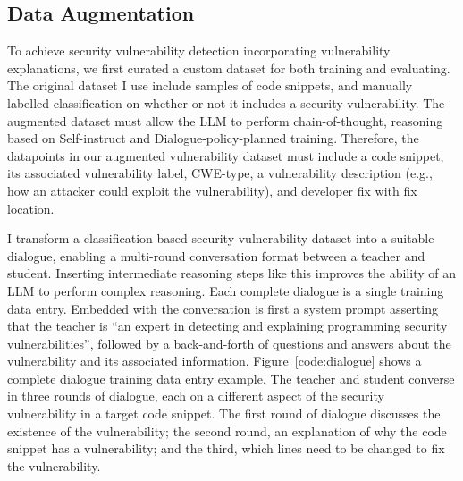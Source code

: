 \documentclass[12pt,openany,oneside,table]{cmuthesis}
\begin{document}
\subsection{Data Augmentation}
To achieve security vulnerability detection incorporating vulnerability explanations, we first curated a custom dataset for both training and evaluating. The original dataset I use include samples of code snippets, and manually labelled classification on whether or not it includes a security vulnerability. The augmented dataset must allow the LLM to perform chain-of-thought, reasoning based on Self-instruct and Dialogue-policy-planned training. Therefore, the datapoints in our augmented vulnerability dataset must include a code snippet, its associated vulnerability label, CWE-type, a vulnerability description (e.g., how an attacker could exploit the vulnerability), and developer fix with fix location. 

I transform a classification based security vulnerability dataset into a suitable dialogue, enabling a multi-round conversation format between a teacher and student. 
Inserting intermediate reasoning steps like this improves the ability of an LLM to perform complex reasoning. Each complete dialogue is a single training data entry. Embedded with the conversation is first a system prompt asserting that the teacher is ``an expert in detecting and explaining programming security vulnerabilities'', followed by a back-and-forth of questions and answers about the vulnerability and its associated information.
Figure~\ref{code:dialogue} shows a complete dialogue training data entry example. The teacher and student converse in three rounds of dialogue, each on a different aspect of the security vulnerability in a target code snippet. The first round of dialogue discusses the existence of the vulnerability; the second round, an explanation of why the code snippet has a vulnerability; and the third, which lines need to be changed to fix the vulnerability.
\end{document}
